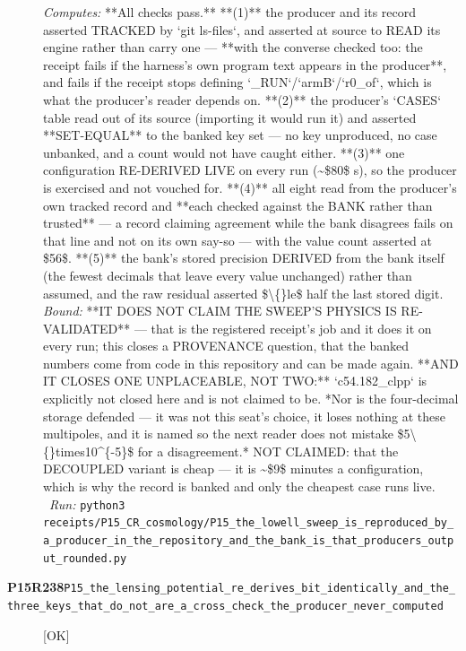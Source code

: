 \begin{description}
\emph{Computes:} **All checks pass.** **(1)** the producer and its record asserted TRACKED by `git ls-files`, and asserted at source to READ its engine rather than carry one --- **with the converse checked too: the receipt fails if the harness's own program text appears in the producer**, and fails if the receipt stops defining `\_RUN`/`armB`/`r0\_of`, which is what the producer's reader depends on. **(2)** the producer's `CASES` table read out of its source (importing it would run it) and asserted **SET-EQUAL** to the banked key set --- no key unproduced, no case unbanked, and a count would not have caught either. **(3)** one configuration RE-DERIVED LIVE on every run (\textasciitilde{}\$80\$ s), so the producer is exercised and not vouched for. **(4)** all eight read from the producer's own tracked record and **each checked against the BANK rather than trusted** --- a record claiming agreement while the bank disagrees fails on that line and not on its own say-so --- with the value count asserted at \$56\$. **(5)** the bank's stored precision DERIVED from the bank itself (the fewest decimals that leave every value unchanged) rather than assumed, and the raw residual asserted \$\textbackslash\{\}le\$ half the last stored digit.
 \emph{Bound:}  **IT DOES NOT CLAIM THE SWEEP'S PHYSICS IS RE-VALIDATED** --- that is the registered receipt's job and it does it on every run; this closes a PROVENANCE question, that the banked numbers come from code in this repository and can be made again. **AND IT CLOSES ONE UNPLACEABLE, NOT TWO:** `c54.182\_clpp` is explicitly not closed here and is not claimed to be.  *Nor is the four-decimal storage defended --- it was not this seat's choice, it loses nothing at these multipoles, and it is named so the next reader does not mistake \$5\textbackslash\{\}times10\textasciicircum{}\{-5\}\$ for a disagreement.* NOT CLAIMED: that the DECOUPLED variant is cheap --- it is \textasciitilde{}\$9\$ minutes a configuration, which is why the record is banked and only the cheapest case runs live.
\ \emph{Run:} \texttt{python3 receipts/P15\_CR\_cosmology/P15\_the\_lowell\_sweep\_is\_reproduced\_by\_a\_producer\_in\_the\_repository\_and\_the\_bank\_is\_that\_producers\_output\_rounded.py}
\item[\rcptlabel{P15_the_lensing_potential_re_derives_bit_identically_and_the_three_keys_that_do_not_are_a_cross_check_the_producer_never_computed}{P15R238}\textbf{P15R238}\quad\texttt{P15\_the\_lensing\_potential\_re\_derives\_bit\_identically\_and\_the\_three\_keys\_that\_do\_not\_are\_a\_cross\_check\_the\_producer\_never\_computed}]\hfill\textsf{[OK]}\\

\end{description}
